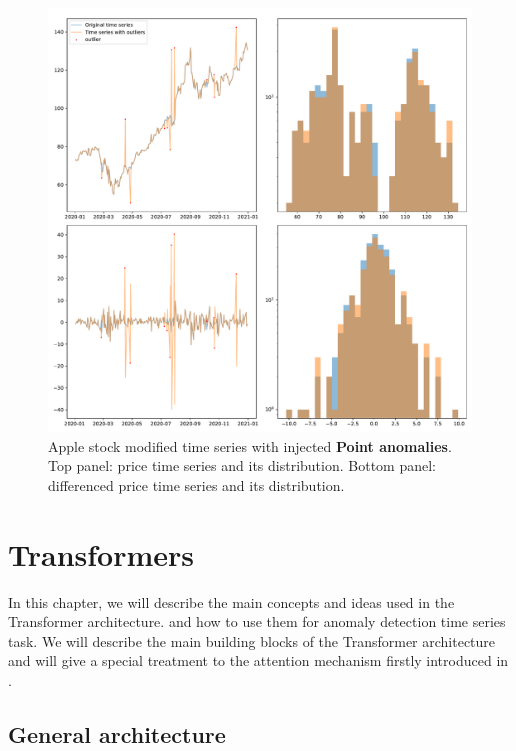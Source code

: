 \documentclass[a4paper, twoside]{report}
\theoremstyle{definition}
\numberwithin{equation}{section}
\begin{document}
\begin{figure}[h!]
    \centering
    \includegraphics[width=\textwidth]{etc/apple_outliers.pdf}
    \caption{Apple stock modified time series with injected \textbf{Point anomalies}.
        Top panel: price time series and its distribution.
        Bottom panel: differenced price time series and its distribution.}
    \label{fig:apple_time_series_outliers}
\end{figure}


\chapter{Transformers} \label{sec:transformers}

In this chapter, we will describe the main concepts and ideas used in the Transformer architecture.
and how to use them for anomaly detection time series task.
We will describe the main building blocks of the Transformer architecture
and will give a special treatment to the attention mechanism firstly introduced in \cite{1409.0473}.

\section{General architecture} \label{sec:general_architecture}
\end{document}
